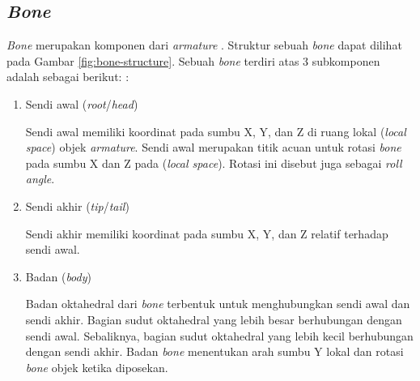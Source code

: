 \subsection{\textit{Bone}}

\textit{Bone} merupakan komponen dari \textit{armature}
\parencite{blender-bones-introduction}. Struktur sebuah \textit{bone} dapat
dilihat pada Gambar \ref{fig:bone-structure}. Sebuah \textit{bone} terdiri atas
3 subkomponen adalah sebagai berikut:
\parencite{blender-armature-structure,blender-glossary}:

\begin{enumerate}
    \item Sendi awal (\textit{root}/\textit{head})

    Sendi awal memiliki koordinat pada sumbu X, Y, dan Z di ruang lokal
    (\textit{local space}) objek \textit{armature}. Sendi awal merupakan titik
    acuan untuk rotasi \textit{bone} pada sumbu X dan Z pada (\textit{local
    space}). Rotasi ini disebut juga sebagai \textit{roll angle}.

    \item Sendi akhir (\textit{tip}/\textit{tail})

    Sendi akhir memiliki koordinat pada sumbu X, Y, dan Z relatif terhadap sendi
    awal.

    \item Badan (\textit{body})

    Badan oktahedral dari \textit{bone} terbentuk untuk menghubungkan sendi awal
    dan sendi akhir. Bagian sudut oktahedral yang lebih besar berhubungan
    dengan sendi awal. Sebaliknya, bagian sudut oktahedral yang lebih kecil
    berhubungan dengan sendi akhir. Badan \textit{bone} menentukan arah sumbu Y
    lokal dan rotasi \textit{bone} objek ketika diposekan.

\end{enumerate}

